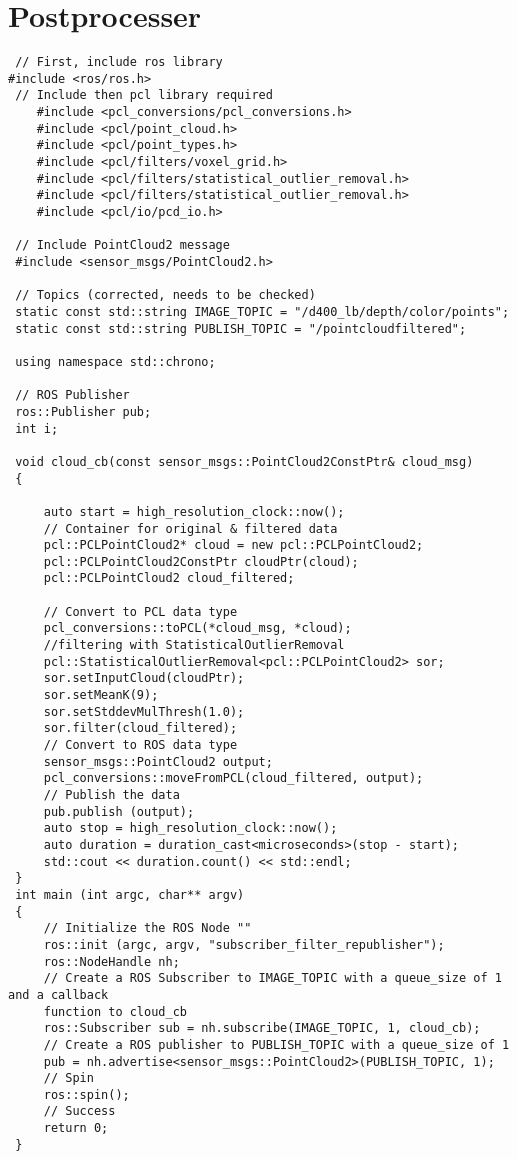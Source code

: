 \section{Postprocesser}
\begin{verbatim}
 // First, include ros library
#include <ros/ros.h>
 // Include then pcl library required
    #include <pcl_conversions/pcl_conversions.h>
    #include <pcl/point_cloud.h>
    #include <pcl/point_types.h>
    #include <pcl/filters/voxel_grid.h>
    #include <pcl/filters/statistical_outlier_removal.h>
    #include <pcl/filters/statistical_outlier_removal.h>
    #include <pcl/io/pcd_io.h>

 // Include PointCloud2 message
 #include <sensor_msgs/PointCloud2.h>

 // Topics (corrected, needs to be checked)
 static const std::string IMAGE_TOPIC = "/d400_lb/depth/color/points";
 static const std::string PUBLISH_TOPIC = "/pointcloudfiltered";

 using namespace std::chrono;

 // ROS Publisher
 ros::Publisher pub;
 int i;

 void cloud_cb(const sensor_msgs::PointCloud2ConstPtr& cloud_msg)
 {

     auto start = high_resolution_clock::now();
     // Container for original & filtered data
     pcl::PCLPointCloud2* cloud = new pcl::PCLPointCloud2;
     pcl::PCLPointCloud2ConstPtr cloudPtr(cloud);
     pcl::PCLPointCloud2 cloud_filtered;

     // Convert to PCL data type
     pcl_conversions::toPCL(*cloud_msg, *cloud);
     //filtering with StatisticalOutlierRemoval
     pcl::StatisticalOutlierRemoval<pcl::PCLPointCloud2> sor;
     sor.setInputCloud(cloudPtr);
     sor.setMeanK(9);
     sor.setStddevMulThresh(1.0);
     sor.filter(cloud_filtered);
     // Convert to ROS data type
     sensor_msgs::PointCloud2 output;
     pcl_conversions::moveFromPCL(cloud_filtered, output);
     // Publish the data
     pub.publish (output);
     auto stop = high_resolution_clock::now();
     auto duration = duration_cast<microseconds>(stop - start);
     std::cout << duration.count() << std::endl;
 }
 int main (int argc, char** argv)
 {
     // Initialize the ROS Node ""
     ros::init (argc, argv, "subscriber_filter_republisher");
     ros::NodeHandle nh;
     // Create a ROS Subscriber to IMAGE_TOPIC with a queue_size of 1 and a callback 
     function to cloud_cb
     ros::Subscriber sub = nh.subscribe(IMAGE_TOPIC, 1, cloud_cb);
     // Create a ROS publisher to PUBLISH_TOPIC with a queue_size of 1
     pub = nh.advertise<sensor_msgs::PointCloud2>(PUBLISH_TOPIC, 1);
     // Spin
     ros::spin();
     // Success
     return 0;
 }
\end{verbatim}